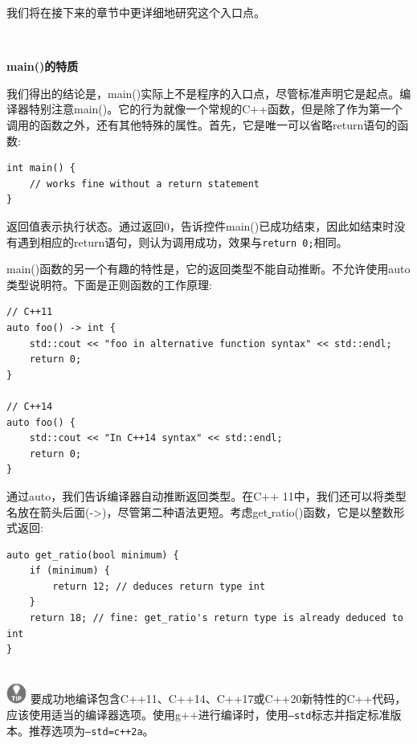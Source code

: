 我们将在接下来的章节中更详细地研究这个入口点。\par

\noindent\textbf{}\ \par
\textbf{main()的特质} \ \par
我们得出的结论是，main()实际上不是程序的入口点，尽管标准声明它是起点。编译器特别注意main()。它的行为就像一个常规的C++函数，但是除了作为第一个调用的函数之外，还有其他特殊的属性。首先，它是唯一可以省略return语句的函数: \par

\begin{lstlisting}[caption={}]
int main() {
	// works fine without a return statement
}
\end{lstlisting}

返回值表示执行状态。通过返回0，告诉控件main()已成功结束，因此如结束时没有遇到相应的return语句，则认为调用成功，效果与\texttt{return 0;}相同。 \par
main()函数的另一个有趣的特性是，它的返回类型不能自动推断。不允许使用auto类型说明符。下面是正则函数的工作原理: \par

\begin{lstlisting}[caption={}]
// C++11
auto foo() -> int {
	std::cout << "foo in alternative function syntax" << std::endl;
	return 0;
}

// C++14
auto foo() {
	std::cout << "In C++14 syntax" << std::endl;
	return 0;
}
\end{lstlisting}

通过auto，我们告诉编译器自动推断返回类型。在C++ 11中，我们还可以将类型名放在箭头后面(->)，尽管第二种语法更短。考虑get\underline{ }ratio()函数，它是以整数形式返回: \par

\begin{lstlisting}[caption={}]
auto get_ratio(bool minimum) {
	if (minimum) {
		return 12; // deduces return type int
	}
	return 18; // fine: get_ratio's return type is already deduced to int
}
\end{lstlisting}

\hspace*{\fill} \\ %
\includegraphics[width=0.05\textwidth]{images/tip}
要成功地编译包含C++11、C++14、C++17或C++20新特性的C++代码，应该使用适当的编译器选项。使用g++进行编译时，使用\texttt{--std}标志并指定标准版本。推荐选项为\texttt{--std=c++2a}。 \par
\noindent\textbf{}\ \par

